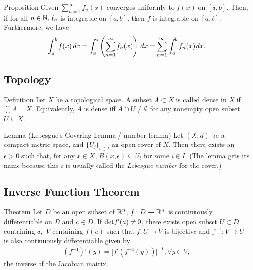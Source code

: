 \begin{thmbox}{Proposition}
Given $\displaystyle{\sum_{n=1}^\infty f_n(x)} $ converges uniformly to $f(x)$ on $[a,b]$. Then, if for all $n \in \mathbb{N}, f_n$ is integrable on $[a,b]$, then $f$ is integrable on $[a,b]$. Furthermore, we have
\begin{align*}
    \int_a^b f(x) \,dx =\int_a^b \left( \sum_{n=1}^\infty f_n(x)\right) \,dx = \sum_{n=1}^\infty \int_a^b f_n(x) \,dx.
\end{align*}
\end{thmbox}

\subsection{Topology}
\begin{defnbox}{Definition}
Let $X$ be a topological space. A subset $A \subset X$ is called dense in $X$ if $\closure{A} = X$. Equivalently, $A$ is dense iff $A \cap U \neq \emptyset$ for any nonempty open subset $U \subseteq X$.
\end{defnbox}

\begin{thmbox}{Lemma (Lebesgue's Covering Lemma / number lemma)}
Let $(X,d)$ be a compact metric space, and $\{U_i\}_{i \in I}$ an open cover of $X$. Then there exists an $\epsilon > 0$ such that, for any $x \in X$, $B(x,\epsilon) \subseteq U_i$ for some $i \in I$. (The lemma gets its name because this $\epsilon$ is usually called the \emph{Lebesgue number} for the cover.)
\end{thmbox}

\subsection{Inverse Function Theorem}
\begin{thmbox}{Theorem}
Let $D$ be an open subset of $\mathbb{R}^n$, $f: D \to \mathbb{R}^n$ is continuously differentiable on $D$ and $a\in D.$ If ${\rm det}f'(a)\ne 0$, there exists open subset $U\subset D$ containing $a,$ $V$ containing $f(a)$ such that $f:U\to V$ is bijective and $f^{-1}:V\to U$ is also continuously differentiable given by
\begin{align*}
    (f^{-1})'(y)=\big[f'(f^{-1}(y))\big]^{-1},\forall y\in V,
\end{align*}
the inverse of the Jacobian matrix.
\end{thmbox}

